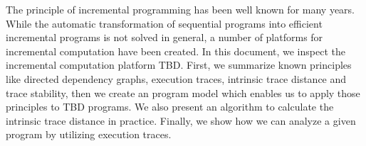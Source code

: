 The principle of incremental programming has been well known for many years. While the automatic transformation of sequential programs into efficient incremental programs is not solved in general, a number of platforms for incremental computation have been created. In this document, we inspect the incremental computation platform TBD. First, we summarize known principles like directed dependency graphs, execution traces, intrinsic trace distance and trace stability, then we create an program model which enables us to apply those principles to TBD programs. We also present an algorithm to calculate the intrinsic trace distance in practice. Finally, we show how we can analyze a given program by utilizing execution traces. 